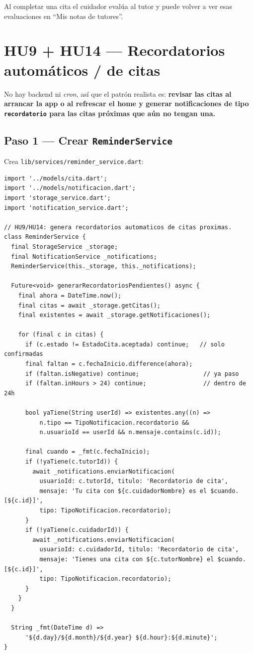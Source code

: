 \documentclass[11pt,a4paper]{article}
\begin{document}
\begin{listo}
Al completar una cita el cuidador evalúa al tutor y puede volver a ver esas
evaluaciones en ``Mis notas de tutores''.
\end{listo}

\section{HU9 + HU14 — Recordatorios automáticos / de citas}

No hay backend ni \emph{cron}, así que el patrón realista es: \textbf{revisar las
citas al arrancar la app o al refrescar el home y generar notificaciones de tipo
\texttt{recordatorio} para las citas próximas que aún no tengan una.}

\subsection{Paso 1 — Crear \texttt{ReminderService}}
Crea \texttt{lib/services/reminder\_service.dart}:

\begin{lstlisting}
import '../models/cita.dart';
import '../models/notificacion.dart';
import 'storage_service.dart';
import 'notification_service.dart';

// HU9/HU14: genera recordatorios automaticos de citas proximas.
class ReminderService {
  final StorageService _storage;
  final NotificationService _notifications;
  ReminderService(this._storage, this._notifications);

  Future<void> generarRecordatoriosPendientes() async {
    final ahora = DateTime.now();
    final citas = await _storage.getCitas();
    final existentes = await _storage.getNotificaciones();

    for (final c in citas) {
      if (c.estado != EstadoCita.aceptada) continue;   // solo confirmadas
      final faltan = c.fechaInicio.difference(ahora);
      if (faltan.isNegative) continue;                  // ya paso
      if (faltan.inHours > 24) continue;                // dentro de 24h

      bool yaTiene(String userId) => existentes.any((n) =>
          n.tipo == TipoNotificacion.recordatorio &&
          n.usuarioId == userId && n.mensaje.contains(c.id));

      final cuando = _fmt(c.fechaInicio);
      if (!yaTiene(c.tutorId)) {
        await _notifications.enviarNotificacion(
          usuarioId: c.tutorId, titulo: 'Recordatorio de cita',
          mensaje: 'Tu cita con ${c.cuidadorNombre} es el $cuando. [${c.id}]',
          tipo: TipoNotificacion.recordatorio);
      }
      if (!yaTiene(c.cuidadorId)) {
        await _notifications.enviarNotificacion(
          usuarioId: c.cuidadorId, titulo: 'Recordatorio de cita',
          mensaje: 'Tienes una cita con ${c.tutorNombre} el $cuando. [${c.id}]',
          tipo: TipoNotificacion.recordatorio);
      }
    }
  }

  String _fmt(DateTime d) =>
      '${d.day}/${d.month}/${d.year} ${d.hour}:${d.minute}';
}
\end{lstlisting}
\end{document}
